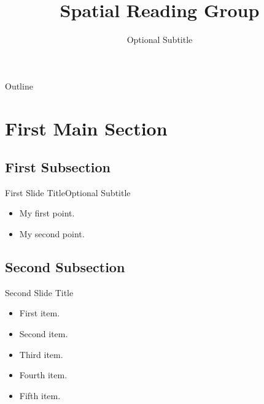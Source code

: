 \documentclass{beamer}
\title{Spatial Reading Group}
\subtitle{Optional Subtitle}
\begin{document}
\begin{frame}
  \titlepage
\end{frame}

\begin{frame}{Outline}
  \tableofcontents
\end{frame}

\section{First Main Section}

\subsection{First Subsection}

\begin{frame}{First Slide Title}{Optional Subtitle}
  \begin{itemize}
  \item {
    My first point.
  }
  \item {
    My second point.
  }
  \end{itemize}
\end{frame}

\subsection{Second Subsection}

\begin{frame}{Second Slide Title}
  \begin{itemize}
  \item {
    First item.
    \pause %
  }
  \item {   
    Second item.
  }
  \item<3-> {
    Third item.
  }
  \item<4-> {
    Fourth item.
  }
  \item<5-> {
    Fifth item. 
  }
  \end{itemize}
\end{frame}
\end{document}
